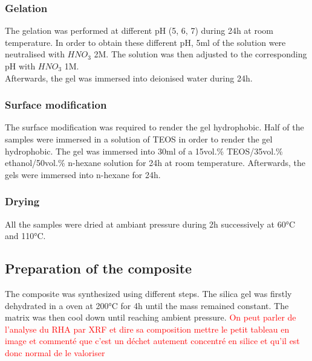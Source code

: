 \documentclass[12pt,a4paper]{article}
\begin{document}
\subsubsection*{Gelation}
The gelation was performed at different pH (5, 6, 7) during 24h at room temperature. In order to obtain these different pH, 5ml of the solution were neutralised with $HNO_3$ 2M. The solution was then adjusted to the corresponding pH with $HNO_3$ 1M.\\
Afterwards, the gel was immersed into deionised water during 24h. 
\subsubsection*{Surface modification}
The surface modification was required to render the gel hydrophobic. Half of the samples were immersed in a solution of TEOS in order to render the gel hydrophobic. The gel was immersed into 30ml of a 15vol.\% TEOS/35vol.\% ethanol/50vol.\% n-hexane solution for 24h at room temperature. Afterwards, the gels were immersed into n-hexane for 24h.
\subsubsection*{Drying}
All the samples were dried at ambiant pressure during 2h successively at 60°C and 110°C.

\subsection{Preparation of the composite}
The composite was synthesized using different steps. The silica gel was firstly dehydrated in a oven at 200°C for 4h until the mass remained constant. The matrix was then cool down until reaching ambient pressure.
\textcolor{red}{On peut parler de l'analyse du RHA par XRF et dire sa composition mettre le petit tableau en image et commenté que c'est un déchet autement concentré en silice et qu'il est donc normal de le valoriser}




\end{document}
